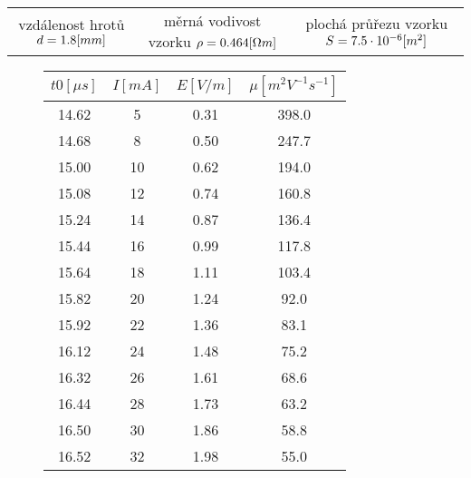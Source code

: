 \documentclass{article}
\begin{document}
\hspace{-8mm}
\begin{tabular}{ccc}
    vzdálenost hrotů \(d = 1.8\-[mm]\) & měrná vodivost vzorku \(\rho = 0.464\-[\Omega m]\) & plochá průřezu vzorku \(S = 7.5\cdot10^{-6}\-[m^2]\) \\
\end{tabular}
\vspace{-5mm}
\begin{figure}[H]
    \begin{minipage}[t]{0.45\textwidth}
        \vspace{-100mm}
        \begin{tabular}{|c|c|c|c|}
            \hline
            \(t0 [\mu s]\)	& \(I [mA]\)	& \(E [V/m]\)	& \(\mu [m^2V^{-1}s^{-1}]\) \\ \hline
            14.62	        &  5	    & 0.31	        & 398.0                     \\ \hline
            14.68	        &  8	    & 0.50	        & 247.7                     \\ \hline
            15.00	        & 10	    & 0.62	        & 194.0                     \\ \hline
            15.08	        & 12	    & 0.74	        & 160.8                     \\ \hline
            15.24	        & 14	    & 0.87	        & 136.4                     \\ \hline
            15.44	        & 16	    & 0.99	        & 117.8                     \\ \hline
            15.64	        & 18	    & 1.11	        & 103.4                     \\ \hline
            15.82	        & 20	    & 1.24	        &  92.0                     \\ \hline
            15.92	        & 22	    & 1.36	        &  83.1                     \\ \hline
            16.12	        & 24	    & 1.48	        &  75.2                     \\ \hline
            16.32	        & 26	    & 1.61	        &  68.6                     \\ \hline
            16.44	        & 28	    & 1.73	        &  63.2                     \\ \hline
            16.50	        & 30	    & 1.86	        &  58.8                     \\ \hline
            16.52	        & 32	    & 1.98	        &  55.0                     \\ \hline

\end{tabular}
\end{minipage}
\end{figure}
\end{document}
